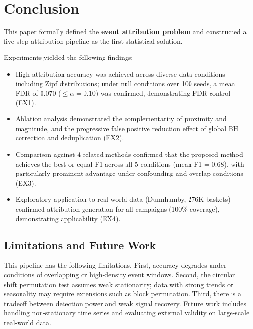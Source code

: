 \section{Conclusion}\label{sec:conclusion}

This paper formally defined the \textbf{event attribution problem}
and constructed a five-step attribution pipeline as the first statistical solution.

Experiments yielded the following findings:
\begin{itemize}
\item High attribution accuracy was achieved across diverse data conditions including
Zipf distributions; under null conditions over 100 seeds,
a mean FDR of 0.070 ($\leq \alpha = 0.10$) was confirmed, demonstrating FDR control (EX1).
\item Ablation analysis demonstrated the complementarity of proximity and magnitude,
and the progressive false positive reduction effect of global BH correction
and deduplication (EX2).
\item Comparison against 4 related methods confirmed that the proposed method
achieves the best or equal F1 across all 5 conditions (mean F1 = 0.68),
with particularly prominent advantage under confounding and overlap conditions (EX3).
\item Exploratory application to real-world data (Dunnhumby, 276K baskets)
confirmed attribution generation for all campaigns (100\% coverage),
demonstrating applicability (EX4).
\end{itemize}

\subsection{Limitations and Future Work}

This pipeline has the following limitations.
First, accuracy degrades under conditions of overlapping or high-density event windows.
Second, the circular shift permutation test assumes weak stationarity;
data with strong trends or seasonality may require extensions such as block permutation.
Third, there is a tradeoff between detection power and weak signal recovery.
Future work includes handling non-stationary time series
and evaluating external validity on large-scale real-world data.
